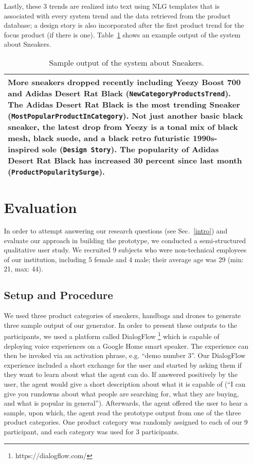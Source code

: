 Lastly, these 3 trends are realized into text using NLG templates that is associated with every system trend and the data retrieved from the product database; a design story is also incorporated after the first product trend for the focus product (if there is one). Table~\ref{tab:output} shows an example output of the system about Sneakers. 

\begin{table}[h]
\caption{Sample output of the system about Sneakers.}
\label{tab:output}
\begin{tabular}{|p{\linewidth}|}
\hline
{\small More sneakers dropped recently including Yeezy Boost 700 and Adidas Desert Rat Black ({\tt NewCategoryProductsTrend}). The Adidas Desert Rat Black is the most trending Sneaker ({\tt MostPopularProductInCategory}). Not just another basic black sneaker, the latest drop from Yeezy is a tonal mix of black mesh, black suede, and a black retro futuristic 1990s-inspired sole ({\tt Design Story}). The popularity of Adidas Desert Rat Black has increased 30 percent since last month ({\tt ProductPopularitySurge}).} \\
\hline
\end{tabular}
\end{table}

\section{Evaluation}

In order to attempt answering our research questions (see Sec.~\ref{intro}) and evaluate our approach in building the prototype, we conducted a semi-structured qualitative user study. We recruited 9 subjects who were non-technical employees of our institution, including 5 female and 4 male; their average age was 29 (min: 21, max: 44).

\subsection{Setup and Procedure}

We used three product categories of sneakers, handbags and drones to generate three sample output of our generator. In order to present these outputs to the participants, we used a platform called DialogFlow \footnote{https://dialogflow.com/} which is capable of deploying voice experiences on a Google Home smart speaker. The experience can then be invoked via an activation phrase, e.g. ``demo number 3''. Our DialogFlow experience included a short exchange for the user and started by asking them if they want to learn about what the agent can do. If answered positively by the user, the agent would give a short description about what it is capable of (``I can give you rundowns about what people are searching for, what they are buying, and what is popular in general''). Afterwards, the agent offered the user to hear a sample, upon which, the agent read the prototype output from one of the three product categories. One product category was randomly assigned to each of our 9 participant, and each category was used for 3 participants. 

